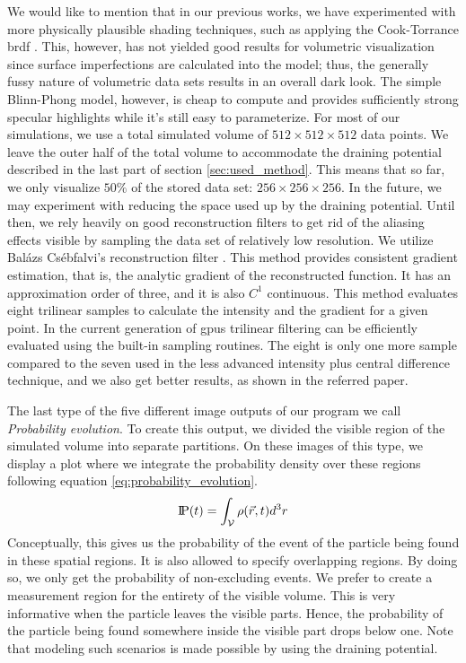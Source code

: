 We would like to mention that in our previous works, we have experimented with more physically plausible shading techniques, such as applying the Cook-Torrance \acrfull{brdf} \cite{CookTorrance1982}.
This, however, has not yielded good results for volumetric visualization since surface imperfections are calculated into the model; thus, the generally fussy nature of volumetric data sets results in an overall dark look.
The simple Blinn-Phong model, however, is cheap to compute and provides sufficiently strong specular highlights while it's still easy to parameterize.
For most of our simulations, we use a total simulated volume of $512\times 512 \times 512$ data points.
We leave the outer half of the total volume to accommodate the draining potential described in the last part of section \ref{sec:used_method}.
This means that so far, we only visualize $50\%$ of the stored data set: $256 \times 256 \times 256$.
In the future, we may experiment with reducing the space used up by the draining potential.
Until then, we rely heavily on good reconstruction filters to get rid of the aliasing effects visible by sampling the data set of relatively low resolution.
We utilize Balázs Csébfalvi's reconstruction filter \cite{csebfalvi2023}.
This method provides consistent gradient estimation, that is, the analytic gradient of the reconstructed function.
It has an approximation order of three, and it is also $C^1$ continuous.
This method evaluates eight trilinear samples to calculate the intensity and the gradient for a given point.
In the current generation of \acrshort{gpu}s trilinear filtering can be efficiently evaluated using the built-in sampling routines.
The eight is only one more sample compared to the seven used in the less advanced intensity plus central difference technique, and we also get better results, as shown in the referred paper.

The last type of the five different image outputs of our program we call \textit{Probability evolution}.
To create this output, we divided the visible region of the simulated volume into separate partitions.
On these images of this type, we display a plot where we integrate the probability density over these regions following equation \ref{eq:probability_evolution}.
\begin{equation}
	\text{I\kern-0.15em P}(t)=\int_\mathcal{V}\rho(\vec{r},t)d^3r
	\label{eq:probability_evolution}
\end{equation}
Conceptually, this gives us the probability of the event of the particle being found in these spatial regions.
It is also allowed to specify overlapping regions.
By doing so, we only get the probability of non-excluding events.
We prefer to create a measurement region for the entirety of the visible volume.
This is very informative when the particle leaves the visible parts. Hence, the probability of the particle being found somewhere inside the visible part drops below one.
Note that modeling such scenarios is made possible by using the draining potential.

